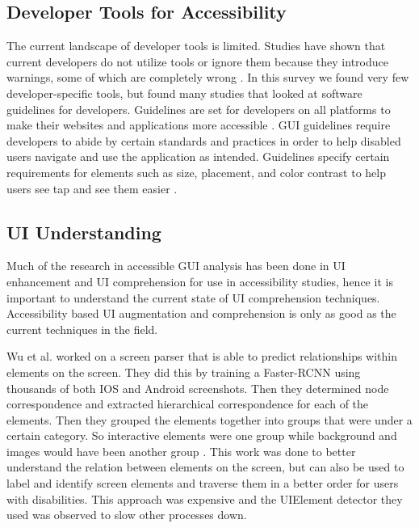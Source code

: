\subsection{Developer Tools for Accessibility}

The current landscape of developer tools is limited. Studies have shown that current developers do not utilize tools or ignore them because they introduce warnings, some of which are completely wrong \cite{Alshayban20}. In this survey we found very few developer-specific tools, but found many studies that looked at software guidelines for developers. Guidelines are set for developers on all platforms to make their websites and applications more accessible \cite{AppleAccess,GoogleAccess,Bajammal21,Vendome19}. GUI guidelines require developers to abide by certain standards and practices in order to help disabled users navigate and use the application as intended. Guidelines specify certain requirements for elements such as size, placement, and color contrast to help users see tap and see them easier \cite{AppleAccess,GoogleAccess}.


\subsection{UI Understanding}

Much of the research in accessible GUI analysis has been done in UI enhancement and UI comprehension for use in accessibility studies, hence it is important to understand the current state of UI comprehension techniques. Accessibility based UI augmentation and comprehension is only as good as the current techniques in the field. 

Wu et al. \cite{Wu21} worked on a screen parser that is able to predict relationships within elements on the screen. They did this by training a Faster-RCNN using thousands of both IOS and Android screenshots. Then they  determined node correspondence and extracted hierarchical correspondence for each of the elements. Then they grouped the elements together into groups that were under a certain category. So interactive elements were one group while background and images would have been another group \cite{Wu21}. This work was done to better understand the relation between elements on the screen, but can also be used to label and identify screen elements and traverse them in a better order for users with disabilities. This approach was expensive and the UIElement detector they used was observed to slow other processes down.

